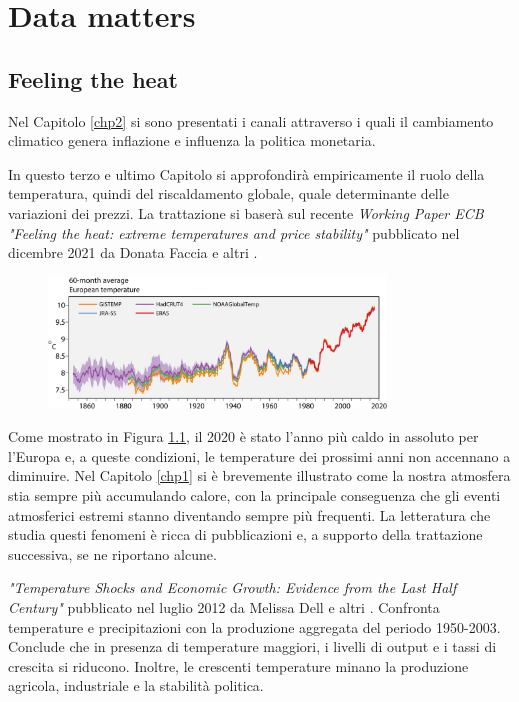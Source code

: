 \chapter{Data matters}
\label{chp3}

\section{Feeling the heat}

Nel Capitolo \ref{chp2} si sono presentati i canali attraverso i quali il cambiamento climatico genera inflazione e influenza la politica monetaria.

In questo terzo e ultimo Capitolo si approfondirà empiricamente il ruolo della temperatura, quindi del riscaldamento globale, quale determinante delle variazioni dei prezzi. La trattazione si baserà sul recente \textit{Working Paper ECB "Feeling the heat: extreme temperatures and price stability"} pubblicato nel dicembre 2021 da Donata Faccia e altri \parencite{ECB:feeling_heat}.

\begin{figure}[h]
	\centering
	\includegraphics[width=0.80\textwidth]{img/europe_temp.pdf}
	\caption{}
	\label{img:europe_temp}
\end{figure}

\noindent\begin{minipage}{\textwidth}
Come mostrato in Figura \ref{img:europe_temp}, il 2020 è stato l'anno più caldo in assoluto per l'Europa e, a queste condizioni, le temperature dei prossimi anni non accennano a diminuire. Nel Capitolo \ref{chp1} si è brevemente illustrato come la nostra atmosfera stia sempre più accumulando calore, con la principale conseguenza che gli eventi atmosferici estremi stanno diventando sempre più frequenti. La letteratura che studia questi fenomeni è ricca di pubblicazioni e, a supporto della trattazione successiva, se ne riportano alcune.
\end{minipage}

\textit{"Temperature Shocks and Economic Growth: Evidence from the Last Half Century"} pubblicato nel luglio 2012 da Melissa Dell e altri \parencite{Dell:temperature}. Confronta temperature e precipitazioni con la produzione aggregata del periodo 1950-2003. Conclude che in presenza di temperature maggiori, i livelli di output e i tassi di crescita si riducono. Inoltre, le crescenti temperature minano la produzione agricola, industriale e la stabilità politica.

